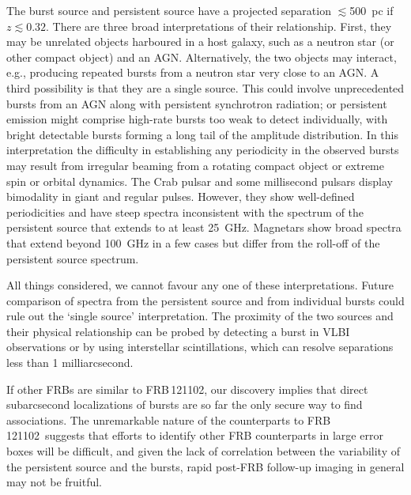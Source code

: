 \documentclass{nature_frb}
\newcommand{\frb}{FRB\,121102}
\begin{document}
The burst source and persistent source have a projected separation $\lesssim$500~pc if  $z \lesssim 0.32$.  There are three broad interpretations of their relationship.
%
First, they may be unrelated objects harboured in a host galaxy,
such as a neutron star (or other compact object) and an AGN.
%
Alternatively, the two objects may interact, e.g., producing repeated bursts from a neutron star very close to an AGN\cite{pc15,cw16,lyu14}.
%
A third possibility is that they are a single source.
This could involve unprecedented bursts from an AGN\cite{rdv16} along with persistent synchrotron radiation;  or persistent emission might comprise high-rate bursts  too weak to detect individually, with bright detectable bursts forming a long tail of the  amplitude distribution. In this interpretation the difficulty in establishing any periodicity in the observed bursts\cite{ssh+16a,ssh+16b} may result from irregular beaming from a rotating compact object or extreme spin or orbital dynamics.
The Crab pulsar and some millisecond pulsars display bimodality\cite{lcu95, kt00} in giant and regular pulses. However, they show well-defined periodicities and have steep spectra
inconsistent with the spectrum of the persistent source that extends to at least 25~GHz.  Magnetars show broad spectra that extend beyond 100~GHz in a few cases but differ from the roll-off of the persistent source spectrum.

All things considered, we cannot favour any one of these interpretations.     Future comparison of spectra from  the persistent source and from  individual bursts could rule out the `single source' interpretation.
The proximity of the two sources and their physical relationship can  be probed by detecting a burst in VLBI observations or by using interstellar scintillations, which can resolve separations less than 1 milliarcsecond.

If other FRBs are similar to \frb, our discovery implies that direct subarcsecond localizations of bursts are so far the only secure way to find associations. The unremarkable nature of the counterparts to \frb\ suggests that efforts to identify other FRB counterparts in large error boxes will be difficult, and given the lack of correlation between the variability of the persistent source and the bursts, rapid post-FRB follow-up imaging in general may not be fruitful.

\clearpage
\end{document}
